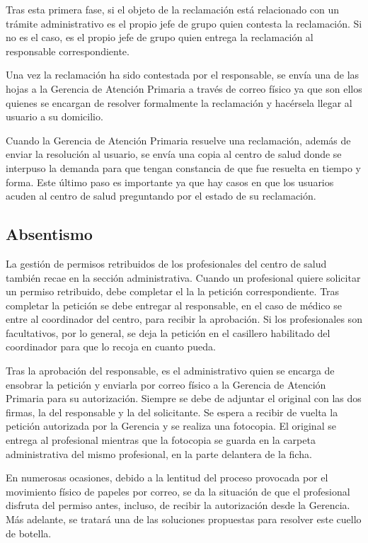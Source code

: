 Tras esta primera fase, si el objeto de la reclamación está relacionado con un trámite administrativo es el propio jefe de grupo quien contesta la reclamación. Si no es el caso, es el propio jefe de grupo quien entrega la reclamación al responsable correspondiente.

Una vez la reclamación ha sido contestada por el responsable, se envía una de las hojas a la Gerencia de Atención Primaria a través de correo físico ya que son ellos quienes se encargan de resolver formalmente la reclamación y hacérsela llegar al usuario a su domicilio.

Cuando la Gerencia de Atención Primaria resuelve una reclamación, además de enviar la resolución al usuario, se envía una copia al centro de salud donde se interpuso la demanda para que tengan constancia de que fue resuelta en tiempo y forma.
Este último paso es importante ya que hay casos en que los usuarios acuden al centro de salud preguntando por el estado de su reclamación.

\subsection{Absentismo}

La gestión de permisos retribuidos de los profesionales del centro de salud también recae en la sección administrativa.
Cuando un profesional quiere solicitar un permiso retribuido, debe completar el la la petición correspondiente.
Tras completar la petición se debe entregar al responsable, en el caso de médico se entre al coordinador del centro, para recibir la aprobación.
Si los profesionales son facultativos, por lo general, se deja la petición en el casillero habilitado del coordinador para que lo recoja en cuanto pueda.

Tras la aprobación del responsable, es el administrativo quien se encarga de ensobrar la petición y enviarla por correo físico a la Gerencia de Atención Primaria para su autorización.
Siempre se debe de adjuntar el original con las dos firmas, la del responsable y la del solicitante.
Se espera a recibir de vuelta la petición autorizada por la Gerencia y se realiza una fotocopia.
El original se entrega al profesional mientras que la fotocopia se guarda en la carpeta administrativa del mismo profesional, en la parte delantera de la ficha.

En numerosas ocasiones, debido a la lentitud del proceso provocada por el movimiento físico de papeles por correo, se da la situación de que el profesional disfruta del permiso antes, incluso, de recibir la autorización desde la Gerencia.
Más adelante, se tratará una de las soluciones propuestas para resolver este cuello de botella.

